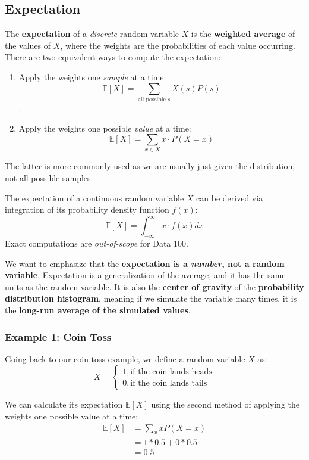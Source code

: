 \documentclass[
  letterpaper,
  DIV=11,
  numbers=noendperiod]{scrreprt}
\providecommand{\tightlist}{%
  \setlength{\itemsep}{0pt}\setlength{\parskip}{0pt}}\usepackage{longtable,booktabs,array}
\begin{document}
\subsection{Expectation}\label{expectation}

The \textbf{expectation} of a \emph{discrete} random variable \(X\) is
the \textbf{weighted average} of the values of \(X\), where the weights
are the probabilities of each value occurring. There are two equivalent
ways to compute the expectation:

\begin{enumerate}
\def\labelenumi{\arabic{enumi}.}
\tightlist
\item
  Apply the weights one \emph{sample} at a time:
  \[\mathbb{E}[X] = \sum_{\text{all possible } s} X(s) P(s)\].
\item
  Apply the weights one possible \emph{value} at a time:
  \[\mathbb{E}[X] = \sum_{x \in X} x \cdot P(X = x)\]
\end{enumerate}

The latter is more commonly used as we are usually just given the
distribution, not all possible samples.

The expectation of a continuous random variable \(X\) can be derived via
integration of its probability density function \(f(x)\):
\[\mathbb{E}[X] = \int_{-\infty}^{\infty} x \cdot f(x) dx\] Exact
computations are \emph{out-of-scope} for Data 100.

We want to emphasize that the \textbf{expectation is a \emph{number},
not a random variable}. Expectation is a generalization of the average,
and it has the same units as the random variable. It is also the
\textbf{center of gravity} of the \textbf{probability distribution
histogram}, meaning if we simulate the variable many times, it is the
\textbf{long-run average of the simulated values}.

\subsubsection{Example 1: Coin Toss}\label{example-1-coin-toss}

Going back to our coin toss example, we define a random variable \(X\)
as: \[X = \begin{cases} 
      1, \text{if the coin lands heads} \\
      0, \text{if the coin lands tails} 
   \end{cases}\]

We can calculate its expectation \(\mathbb{E}[X]\) using the second
method of applying the weights one possible value at a time:
\[\begin{align}
 \mathbb{E}[X] &= \sum_{x} x P(X=x) \\
 &= 1 * 0.5 + 0 * 0.5 \\
 &= 0.5
\end{align}\]
\end{document}
